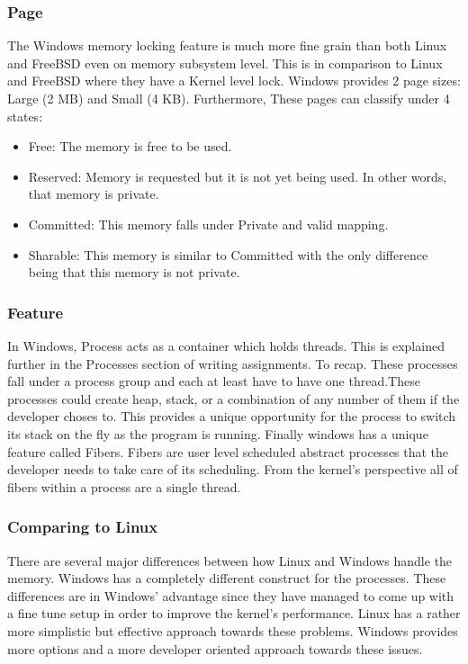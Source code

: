 \documentclass[journal,10pt,onecolumn,compsoc,letterpaper,draftclsnofoot,table,xcdraw]{IEEEtran} \usepackage[margin=0.75in]{geometry}
\begin{document}
\subsubsection{Page}
\noindent The Windows memory locking feature is much more fine grain than both Linux and FreeBSD even on memory subsystem level. This is in comparison to Linux and FreeBSD where they have a Kernel level lock. Windows provides 2 page sizes: Large (2 MB) and Small (4 KB). Furthermore, These pages can classify under 4 states:
\begin{itemize}
\item Free: The memory is free to be used.
\item Reserved: Memory is requested but it is not yet being used. In other words, that memory is private.
\item Committed: This memory falls under Private and valid mapping.
\item Sharable: This memory is similar to Committed with the only difference being that this memory is not private.
\end{itemize}
\subsubsection{Feature}
\noindent In Windows, Process acts as a container which holds threads. This is explained further in the Processes section of writing assignments. To recap. These processes fall under a process group and each at least have to have one thread.These processes could create heap, stack, or a combination of any number of them if the developer choses to. This provides a unique opportunity for the process to switch its stack on the fly as the program is running. Finally windows has a unique feature called Fibers. Fibers are user level scheduled abstract processes that the developer needs to take care of its scheduling. From the kernel's perspective all of fibers within a process are a single thread.
\subsubsection{Comparing to Linux}
\noindent There are several major differences between how Linux and Windows handle the memory. Windows has a completely different construct for the processes. These differences are in Windows' advantage since they have managed to come up with a fine tune setup in order to improve the kernel's performance. Linux has a rather more simplistic but effective approach towards these problems. Windows provides more options and a more developer oriented approach towards these issues.
\end{document}
